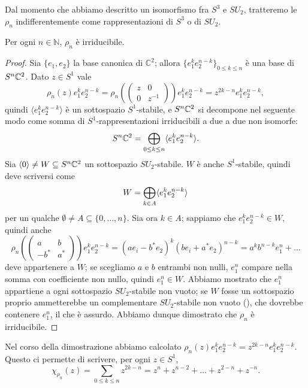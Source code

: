 Dal momento che abbiamo descritto un isomorfismo fra $S^3$ e $SU_2$, tratteremo le $\rho_n$ indifferentemente come rappresentazioni di $S^3$ o di $SU_2$.
\begin{proposition}
Per ogni $n\in\mathbb{N}$, $\rho_n$ è irriducibile.
\end{proposition}
\begin{proof}
Sia $\{e_1,e_2\}$ la base canonica di $\mathbb{C}^2$; allora $\{e_1^ke_2^{n-k}\}_{0\le k\le n}$ è una base di $S^n\mathbb{C}^2$. Dato $z\in S^1$ vale
$$
\rho_n(z)e_1^ke_2^{n-k}=\rho_n\left(\begin{pmatrix}z&0\\0&z^{-1}\end{pmatrix}\right)e_1^ke_2^{n-k}=z^{2k-n}e_1^ke_2^{n-k},
$$
quindi $\langle e_1^ke_2^{n-k}\rangle$ è un sottospazio $S^1$-stabile, e $S^n\mathbb{C}^2$ si decompone nel seguente modo come somma di $S^1$-rappresentazioni irriducibili a due a due non isomorfe:
$$
S^n\mathbb{C}^2=\bigoplus_{0\le k\le n}\langle e_1^ke_2^{n-k}\rangle.
$$
Sia $\langle 0\rangle\neq W\subseteq S^n\mathbb{C}^2$ un sottospazio $SU_2$-stabile. $W$ è anche $S^1$-stabile, quindi deve scriversi come
$$
W=\bigoplus_{k\in A}\langle e_1^ke_2^{n-k}\rangle
$$
per un qualche $\emptyset\neq A\subseteq\{0,\ldots, n\}$. Sia ora $k\in A$; sappiamo che $e_1^ke_2^{n-k}\in W$, quindi anche
$$
\rho_n\left(\begin{pmatrix}a&b\\-b^*&a^*\end{pmatrix}\right)e_1^ke_2^{n-k}=(ae_i-b^*e_2)^k(be_i+a^*e_2)^{n-k}=a^kb^{n-k}e_1^n+\ldots
$$
deve appartenere a $W$; se scegliamo $a$ e $b$ entrambi non nulli, $e_1^n$ compare nella somma con coefficiente non nullo, quindi $e_1^n\in W$. Abbiamo mostrato che $e_1^n$ appartiene a ogni sottospazio $SU_2$-stabile non vuoto; se $W$ fosse un sottospazio proprio ammetterebbe un complementare $SU_2$-stabile non vuoto (), che dovrebbe contenere $e_1^n$, il che è assurdo. Abbiamo dunque dimostrato che $\rho_n$ è irriducibile.
\end{proof}

Nel corso della dimostrazione abbiamo calcolato $\rho_n(z)e_1^ke_2^{n-k}=z^{2k-n}e_1^ke_2^{n-k}$. Questo ci permette di scrivere, per ogni $z\in S^1$,
$$
\chi_{\rho_n}(z)=\sum_{0\le k\le n}z^{2k-n}=z^n+z^{n-2}+\ldots+z^{2-n}+z^{-n}.
$$

